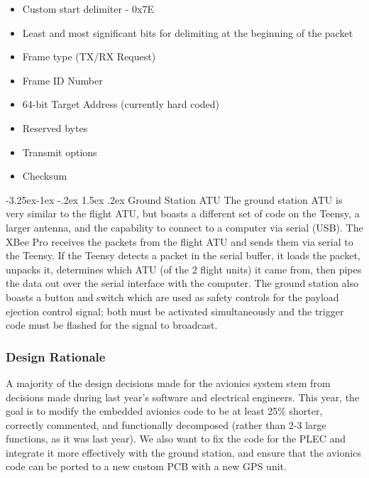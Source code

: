 \documentclass[onecolumn, draftclsnofoot, 10pt, compsoc]{IEEEtran}
\makeatletter
\renewcommand\paragraph{\@startsection{paragraph}{4}{\z@}%
                                     {-3.25ex\@plus -1ex \@minus -.2ex}%
                                     {1.5ex \@plus .2ex}%
                                     {\normalfont\normalsize\bfseries}}
\makeatother
\begin{document}
\begin{itemize}
    \item Custom start delimiter - 0x7E
    \item Least and most significant bits for delimiting at the beginning of the packet
    \item Frame type (TX/RX Request)
    \item Frame ID Number
    \item 64-bit Target Address (currently hard coded)
    \item Reserved bytes
    \item Transmit options
    \item Checksum
\end{itemize}

\paragraph{Ground Station ATU}
The ground station ATU is very similar to the flight ATU, but boasts a different set of code on the Teensy, a larger antenna, and the capability to connect to a computer via serial (USB). The XBee Pro receives the packets from the flight ATU and sends them via serial to the Teensy. If the Teensy detects a packet in the serial buffer, it loads the packet, unpacks it, determines which ATU (of the 2 flight units) it came from, then pipes the data out over the serial interface with the computer. The ground station also boasts a button and switch which are used as safety controls for the payload ejection control signal; both must be activated simultaneously and the trigger code must be flashed for the signal to broadcast.  \newline

\subsubsection{Design Rationale}
A majority of the design decisions made for the avionics system stem from decisions made during last year's software and electrical engineers. This year, the goal is to modify the embedded avionics code to be at least 25\% shorter, correctly commented, and functionally decomposed (rather than 2-3 large functions, as it was last year). We also want to fix the code for the PLEC and integrate it more effectively with the ground station, and ensure that the avionics code can be ported to a new custom PCB with a new GPS unit.
\end{document}
